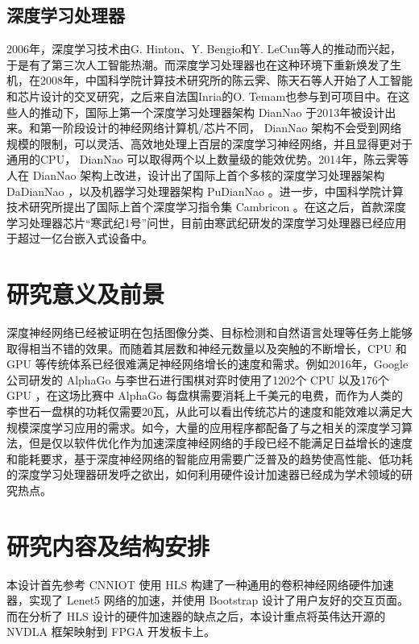 \subsection{深度学习处理器}

2006年，深度学习技术由G. Hinton、Y. Bengio和Y. LeCun等人的推动而兴起，于是有了第三次人工智能热潮。而深度学习处理器也在这种环境下重新焕发了生机，在2008年，中国科学院计算技术研究所的陈云霁、陈天石等人开始了人工智能和芯片设计的交叉研究，之后来自法国Inria的O. Temam也参与到可项目中。在这些人的推动下，国际上第一个深度学习处理器架构 DianNao 于2013年被设计出来。和第一阶段设计的神经网络计算机/芯片不同， DianNao 架构不会受到网络规模的限制，可以灵活、高效地处理上百层的深度学习神经网络，并且显得更对于通用的CPU， DianNao\cite{10.1145/2654822.2541967} 可以取得两个以上数量级的能效优势。2014年，陈云霁等人在 DianNao 架构上改进，设计出了国际上首个多核的深度学习处理器架构 DaDianNao\cite{7011421} ，以及机器学习处理器架构 PuDianNao \cite{10.1145/2786763.2694358} 。进一步，中国科学院计算技术研究所提出了国际上首个深度学习指令集 Cambricon\cite{7551409} 。在这之后，首款深度学习处理器芯片“寒武纪1号”问世，目前由寒武纪研发的深度学习处理器已经应用于超过一亿台嵌入式设备中。

\section{研究意义及前景}

深度神经网络已经被证明在包括图像分类、目标检测和自然语言处理等任务上能够取得相当不错的效果。而随着其层数和神经元数量以及突触的不断增长，CPU 和 GPU 等传统体系已经很难满足神经网络增长的速度和需求。例如2016年，Google公司研发的 AlphaGo 与李世石进行围棋对弈时使用了1202个 CPU 以及176个 GPU\cite{薛永红2019机器下棋的历史与启示} ，在这场比赛中 AlphaGo 每盘棋需要消耗上千美元的电费，而作为人类的李世石一盘棋的功耗仅需要20瓦，从此可以看出传统芯片的速度和能效难以满足大规模深度学习应用的需求。如今，大量的应用程序都配备了与之相关的深度学习算法，但是仅以软件优化作为加速深度神经网络的手段已经不能满足日益增长的速度和能耗要求，基于深度神经网络的智能应用需要广泛普及的趋势使高性能、低功耗的深度学习处理器研发呼之欲出，如何利用硬件设计加速器已经成为学术领域的研究热点。

\section{研究内容及结构安排}

本设计首先参考 CNNIOT 使用 HLS 构建了一种通用的卷积神经网络硬件加速器，实现了 Lenet5 网络的加速，并使用 Bootstrap 设计了用户友好的交互页面。而在分析了 HLS 设计的硬件加速器的缺点之后，本设计重点将英伟达开源的 NVDLA 框架映射到 FPGA 开发板卡上。

